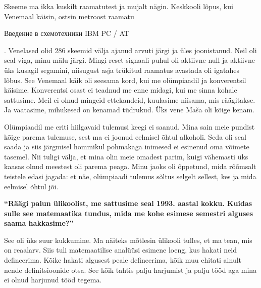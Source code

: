 Skeeme ma ikka kuskilt raamatutest ja mujalt nägin. Keskkooli lõpus, kui Venemaal käisin, ostsin metroost raamatu \begin{russian}Введение в схемотехники IBM PC / AT\end{russian}. Venelased olid 286 skeemid välja ajanud arvuti järgi ja üles joonistanud. Neil oli seal viga, minu mälu järgi. Mingi reset signaali puhul oli aktiivne null ja aktiivne üks kusagil segamini, niisugust asja trükitud raamatus avastada oli igatahes lõbus. See Venemaal käik oli seesama kord, kui me olümpiaadil ja konverentsil käisime. Konverentsi osast ei teadnud me enne midagi, kui me sinna kohale sattusime. Meil ei olnud mingeid ettekandeid, kuulasime niisama, mis räägitakse. Ja vaatasime, mihukesed on kenamad tüdrukud. Üks vene Maša oli kõige kenam. 

Olümpiaadil me eriti hiilgavaid tulemusi keegi ei saanud. Mina sain meie pundist kõige parema tulemuse, sest ma ei joonud eelmisel õhtul alkoholi. Seda oli seal saada ja siis järgmisel hommikul pohmakaga inimesed ei esinenud oma võimete tasemel. Nii tuligi välja, et mina olin meie omadest parim, kuigi vähemasti üks kaasas olnud meestest oli parema peaga. Minu jaoks oli õppetund, mida rõõmsalt teistele edasi jagada: et näe, olümpiaadi tulemus sõltus selgelt sellest, kes ja mida eelmisel õhtul jõi. 

\textbf{\enquote{Räägi palun ülikoolist, me sattusime seal 1993. aastal kokku. Kuidas sulle see matemaatika tundus, mida me kohe esimese semestri alguses saama hakkasime?}}

See oli üks suur kukkumine. Ma näiteks mõtlesin ülikooli tulles, et ma tean, mis on reaalarv. Siis tuli matemaatilise analüüsi esimene loeng, kus hakati neid defineerima. Kõike hakati algusest peale defineerima, kõik muu ehitati ainult nende definitsioonide otsa. See kõik tahtis palju harjumist ja palju tööd aga mina ei olnud harjunud tööd tegema. 


